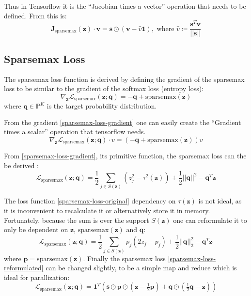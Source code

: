 Thus in Tensorflow it is the ``Jacobian times a vector'' operation that needs to be defined. From \cite{sparsemax} this is:
\begin{equation}
\mathbf{J}_{\mathrm{sparsemax}}(\mathbf{z}) \cdot \mathbf{v} = \mathbf{s} \odot (\mathbf{v} - \hat{v} \mathbf{1}), \text{  where } \hat{v} \coloneqq \frac{\mathbf{s}^T \mathbf{v}}{||\mathbf{s}||}
\end{equation}

\subsection{Sparsemax Loss}

The sparsemax loss function is derived by defining the gradient of the sparsemax loss to be similar to the gradient of the softmax loss (entropy loss):
\begin{equation}
\nabla_{\mathbf{z}} \mathcal{L}_{\mathrm{sparsemax}}(\mathbf{z}; \mathbf{q}) = -\mathbf{q} + \mathrm{sparsemax}(\mathbf{z})
\label{sparsemax-loss-gradient}
\end{equation}
where $\mathbf{q} \in \mathbb{P}^K$ is the target probability distribution.

From the gradient \eqref{sparsemax-loss-gradient} one can easily create the ``Gradient times a scalar'' operation that tensorflow needs.
\begin{equation}
\nabla_{\mathbf{z}} \mathcal{L}_{\mathrm{sparsemax}}(\mathbf{z}; \mathbf{q}) \cdot v = (-\mathbf{q} + \mathrm{sparsemax}(\mathbf{z})) v
\end{equation}

From \eqref{sparsemax-loss-gradient}, its primitive function, the sparsemax loss can the be derived \cite{sparsemax}:
\begin{equation}
\mathcal{L}_{\mathrm{sparsemax}}(\mathbf{z}; \mathbf{q}) = \frac{1}{2} \sum_{j \in S(\mathbf{z})} (z_j^2 - \tau^2(\mathbf{z})) + \frac{1}{2} ||\mathbf{q}||^2 - \mathbf{q}^T \mathbf{z}
\label{sparsemax-loss-original}
\end{equation}

The loss function \eqref{sparsemax-loss-original} dependency on $\tau(\mathbf{z})$ is not ideal, as it is inconvenient to recalculate it or alternatively store it in memory. Fortunately, because the sum is over the support $S(\mathbf{z})$ one can reformulate it to only be dependent on $\mathbf{z}$, $\mathrm{sparsemax}(\mathbf{z})$ and $\mathbf{q}$:
\begin{equation}
\mathcal{L}_{\mathrm{sparsemax}}(\mathbf{z}; \mathbf{q}) = \frac{1}{2} \sum_{j \in S(\mathbf{z})} p_j (2 z_j - p_j) + \frac{1}{2} ||\mathbf{q}||_2^2 - \mathbf{q}^T \mathbf{z}
\label{sparsemax-loss-reformulated}
\end{equation}
where $\mathbf{p} = \mathrm{sparsemax}(\mathbf{z})$. Finally the sparsemax loss \eqref{sparsemax-loss-reformulated} can be changed slightly, to be a simple map and reduce which is ideal for parallization:
\begin{equation}
\mathcal{L}_{\mathrm{sparsemax}}(\mathbf{z}; \mathbf{q}) = \mathbf{1}^T \left( \mathbf{s} \odot \mathbf{p} \odot \left(\mathbf{z} - \tfrac{1}{2} \mathbf{p}\right) + \mathbf{q} \odot \left(\tfrac{1}{2} \mathbf{q} - \mathbf{z}\right)\right)
\end{equation}

